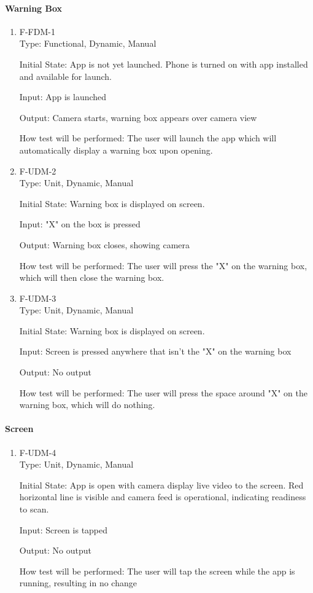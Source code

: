 \documentclass[12pt, titlepage]{article}
\begin{document}
\paragraph{Warning Box}
\begin{enumerate}
\item{F-FDM-1\\}
Type: Functional, Dynamic, Manual
					
Initial State: 
App is not yet launched. Phone is turned on with app installed and available for launch.
					
Input: 
App is launched
					
Output: 
Camera starts, warning box appears over camera view
					
How test will be performed: 
The user will launch the app which will automatically display a warning box upon opening.

\item{F-UDM-2\\}
Type: Unit, Dynamic, Manual
					
Initial State: 
Warning box is displayed on screen.
					
Input: 
"X" on the box is pressed
					
Output: 
Warning box closes, showing camera
					
How test will be performed: 
The user will press the "X" on the warning box, which will then close the warning box.

\item{F-UDM-3\\}
Type: Unit, Dynamic, Manual
					
Initial State: 
Warning box is displayed on screen.
					
Input: 
Screen is pressed anywhere that isn't the "X" on the warning box
					
Output: 
No output
					
How test will be performed: 
The user will press the space around "X" on the warning box, which will do nothing.

\end{enumerate}

\paragraph{Screen}
\begin{enumerate}
\item{F-UDM-4\\}
Type: Unit, Dynamic, Manual
					
Initial State: 
App is open with camera display live video to the screen. Red horizontal line is visible and camera feed is operational, indicating readiness to scan.
					
Input: 
Screen is tapped
					
Output: 
No output
					
How test will be performed: 
The user will  tap the screen while the app is running, resulting in no change

\end{enumerate}
\end{document}
